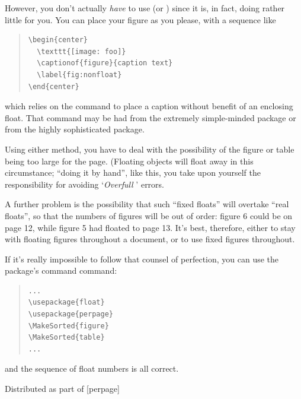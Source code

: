 However, you don't actually \emph{have} to use  (or
) since it is, in fact, doing rather little for you.
You can place your figure as you please, with a sequence like
\begin{quote}
\begin{verbatim}
\begin{center}
  \texttt{[image: foo]}
  \captionof{figure}{caption text}
  \label{fig:nonfloat}
\end{center}
\end{verbatim}
\end{quote}
which relies on the  command to place a caption without
benefit of an enclosing float.  That command may be had from the extremely
simple-minded package  or from the highly
sophisticated  package.

Using either method, you have to deal with the possibility of the
figure or table being too large for the page.  (Floating objects will
float away in this circumstance; ``doing it by hand'', like this, you
take upon yourself the responsibility for avoiding %
`\textit{Overfull }' errors.

A further problem is the possibility that such ``fixed floats'' will
overtake ``real floats'', so that the numbers of figures will be out
of order: figure 6 could be on page 12, while figure 5 had floated to
page 13.  It's best, therefore, either to stay with floating figures
throughout a document, or to use fixed figures throughout.

If it's really impossible to follow that counsel of perfection, you
can use the  package's command 
command:
\begin{quote}
\begin{verbatim}
...
\usepackage{float}
\usepackage{perpage}
\MakeSorted{figure}
\MakeSorted{table}
...
\end{verbatim}
\end{quote}
and the sequence of float numbers is all correct.
\begin{ctanrefs}
\item[capt-of.sty]
\item[caption.sty]
\item[float.sty]
\item[here.sty]
\item[perpage.sty]Distributed as part of [perpage]
\end{ctanrefs}

